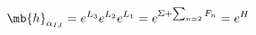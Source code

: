 \begin{equation}
 {\mb{h}}_{\alpha_{IJ}}=e^{L_3}e^{L_2}e^{L_1}=e^{ \Sigma+\sum_{n=2}F_{n}} =e^{H}
\label{EQH}
\end{equation}

